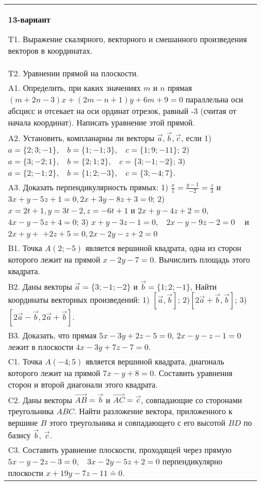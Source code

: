 \documentclass{article}
\begin{document}
\begin{tabular}{m{17cm}}
\textbf{13-вариант}
\newline

T1. 
Выражение скалярного, векторного и смешанного произведения векторов в координатах.
 \\
T2. Уравнении прямой на плоскости.
 \\
A1. 
Определить, при каких значениях \(m\) и \(n\) прямая \((m + 2n - 3)x + (2m - n + 1)y + 6m + 9 = 0\) параллельна оси абсцисс и отсекает на оси ординат отрезок, равный -3 (считая от начала координат). Написать уравнение этой прямой.
 \\
A2. 
Установить, компланарны ли векторы \(\overrightarrow{a},\overrightarrow{b},\overrightarrow{c}\), если 1)\(a = \{ 2;3; - 1\},\ \ \ \ b = \{ 1; - 1;3\},\ \ \ \ c = \{ 1;9; - 11\}\); 2)\(a = \{ 3; - 2;1\},\ \ \ \ b = \{ 2;1;2\},\ \ \ \ c = \{ 3; - 1; - 2\}\); 3)\(a = \{ 2; - 1;2\},\ \ \ \ b = \{ 1;2; - 3\},\ \ \ \ c = \{ 3; - 4;7\}\). \\
A3. 
Доказать перпендикулярность прямых: 1) \(\frac{x}{1} = \frac{y - 1}{- 2} = \frac{z}{3}\) и \(3x + y - 5z + 1 = 0,2x + 3y - 8z + 3 = 0\); 2) \(x = 2t + 1,y = 3t - 2,z = - 6t + 1\) и \(2x + y - 4z + 2 = 0\), \(4x - y - 5z + 4 = 0\); 3) \(x + y - 3z - 1 = 0,\ \ \ \ 2x - y - 9z - 2 = 0\ \ \ \ \) и \(2x + y +\) \(+ 2z + 5 = 0,2x - 2y - z + 2 = 0\)
 \\
B1. 
Точка \(A(2; - 5)\) является вершиной квадрата, одна из сторон которого лежит на прямой \(x - 2y - 7 = 0\). Вычислить площадь этого квадрата.
 \\
B2. 
Даны векторы \(\overrightarrow{a} = \{ 3; - 1; - 2\}\) и \(\overrightarrow{b} = \{ 1;2; - 1\}\), Найти координаты векторных произведений: 1) \(\left\lbrack \overrightarrow{a},\overrightarrow{b} \right\rbrack\); 2)\(\left\lbrack 2\overrightarrow{a} + \overrightarrow{b},\overrightarrow{b} \right\rbrack\); 3) \(\left\lbrack 2\overrightarrow{a} - \overrightarrow{b},2\overrightarrow{a} + \overrightarrow{b} \right\rbrack\).
 \\
B3. 
Доказать, что прямая \(5x - 3y + 2z - 5 = 0\), \(2x - y - z - 1 = 0\) лежит в плоскости \(4x - 3y + 7z - 7 = 0\).
 \\
C1. 
Точка \(A( - 4;5)\) является вершиной квадрата, диагональ которого лежит на прямой \(7x - y + 8 = 0\). Составить уравнения сторон и второй диагонали этого квадрата.
 \\
C2. 
Даны векторы \(\overrightarrow{AB} = \overrightarrow{b}\) и \(\overrightarrow{AC} = \overrightarrow{c}\), совпадающие со сторонами треугольника \(ABC\). Найти разложение вектора, приложенного к вершине \(B\) этого треугольника и совпадающего с его высотой \(BD\) по базису \(\overrightarrow{b},\ \overrightarrow{c}\).
 \\
C3. 
Составить уравнение плоскости, проходящей через прямую \(5x - y - 2z - 3 = 0,\ \ \ \ 3x - 2y - 5z + 2 = 0\) перпендикулярно плоскости \(x + 19y - 7z - 11 \doteq 0\).
 \\

\end{tabular}
\vspace{1cm}
\end{document}
